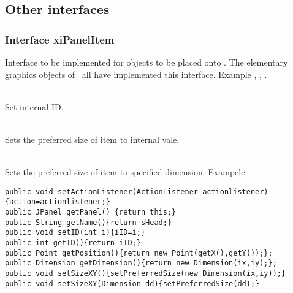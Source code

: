 \item {}
\item {}
\item {}
\item {}
\item {}
\item {}
\item {}
\item {}
\item {}
\item {}
\item {}
\item {}
\item {}
\item {}
\item {}
\item {}
\item {}
\ecir
\subsection{Other interfaces}
\subsubsection{Interface xiPanelItem}
Interface to be implemented for objects to be placed onto .
The elementary graphics objects of \gui~all have implemented this interface.
Example , , .
\bcir
\item {}
\item {}
\item {}
\item {}
\item {}
\item {}
\item {}\\
Set internal ID.
\item {}\\
Sets the preferred size of item to internal vale.
\item {}\\
Sets the preferred size of item to specified dimension.
\ecir
Exampele:
\begin{verbatim}
public void setActionListener(ActionListener actionlistener){action=actionlistener;}
public JPanel getPanel() {return this;}
public String getName(){return sHead;}
public void setID(int i){iID=i;}
public int getID(){return iID;}
public Point getPosition(){return new Point(getX(),getY());};
public Dimension getDimension(){return new Dimension(ix,iy);};
public void setSizeXY(){setPreferredSize(new Dimension(ix,iy));}
public void setSizeXY(Dimension dd){setPreferredSize(dd);}
\end{verbatim}
